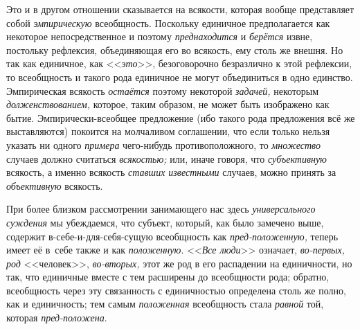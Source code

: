 \label{bkm:bm38a}Это и в другом отношении сказывается на всякости, которая
вообще представляет собой {\em эмпирическую} всеобщность. Поскольку единичное
предполагается как некоторое непосредственное и поэтому {\em преднаходится} и
{\em берётся} извне, постольку рефлексия, объединяющая его во всякость, ему
столь же внешня. Но так как единичное, как <<{\em это}>>, безоговорочно
безразлично к этой рефлексии, то всеобщность и такого рода единичное не могут
объединиться в одно единство. Эмпирическая всякость {\em остаётся} поэтому
некоторой {\em задачей,} некоторым {\em долженствованием,} которое, таким
образом, не может быть изображено как бытие. Эмпирически-всеобщее предложение
(ибо такого рода предложения всё же выставляются) покоится на молчаливом
соглашении, что если только нельзя указать ни одного {\em примера} чего-нибудь
противоположного, то {\em множество} случаев должно считаться {\em всякостью;}
или, иначе говоря, что {\em субъективную} всякость, а именно всякость
{\em ставших известными} случаев, можно принять за {\em объективную} всякость.

При более близком рассмотрении занимающего нас здесь {\em универсального
суждения} мы убеждаемся, что субъект, который, как было замечено выше, содержит
в-себе-и-для-себя-сущую всеобщность как {\em пред-положенную,} теперь имеет её
в~себе также и как {\em положенную}. <<{\em Все люди}>> означает,
{\em во-первых, род} <<человек>>, {\em во-вторых,} этот же род в его
распадении на единичности, но так, что единичные вместе с тем расширены до
всеобщности рода; обратно, всеобщность через эту связанность с единичностью
определена столь же полно, как и единичность; тем самым {\em положенная}
всеобщность стала {\em равной} той, которая {\em пред-положена}.

